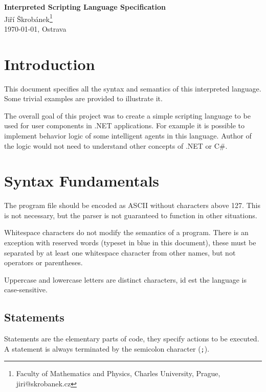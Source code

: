 \documentclass[a4paper,11pt,openany]{article}
\begin{document}
\begin{center}
{\huge \textbf{Interpreted Scripting Language Specification}}\\
\vspace{10mm} {\large Jiří Škrobánek\footnote[1]{Faculty of Mathematics and Physics, Charles University, Prague, {\ttfamily jiri@skrobanek.cz}}}\\
\vspace{10mm}\today, Ostrava
\end{center}
	
\section*{Introduction}
	
This document specifies all the syntax and semantics of this interpreted language. Some trivial examples are provided to illustrate it.

The overall goal of this project was to create a simple scripting language to be used for user components in .NET applications. 
For example it is possible to implement behavior logic of some intelligent agents in this language. Author of the logic would not need to understand other concepts of .NET or C\#.
	
\tableofcontents

\section{Syntax Fundamentals}

The program file should be encoded as ASCII without characters above 127. This is not necessary, but the parser is not guaranteed to function in other situations.

Whitespace characters do not modify the semantics of a program. There is an exception with reserved words (typeset in blue in this document), these must be separated by at least one whitespace character from other names, but not operators or parentheses.

Uppercase and lowercase letters are distinct characters, id est the language is case-sensitive.

\subsection{Statements}

Statements are the elementary parts of code, they specify actions to be executed. A statement is always terminated by the semicolon character (\texttt{;}).
\end{document}

